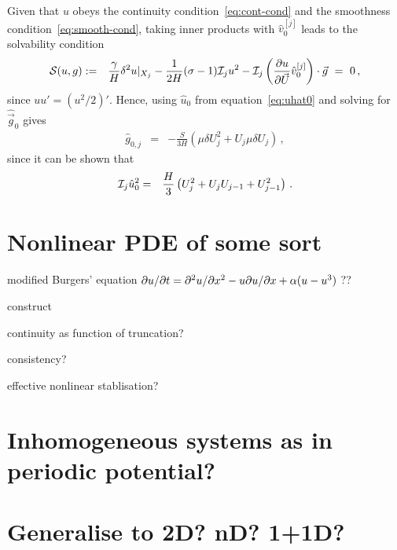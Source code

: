 \documentclass[12pt,a5paper]{article}
\begin{document}
Given that $u$ obeys the continuity condition~\eqref{eq:cont-cond} and the smoothness condition~\eqref{eq:smooth-cond}, taking inner products with $\hat{v}_0^{[j]}$ leads to the solvability condition
\begin{eqnarray}
       {\cal S}(u,g) & := & 
          \frac{\gamma}{H}\delta^2u|_{X_j} - \frac{1}{2H}(\sigma-1){\cal I}_j u^2
	-{\cal I}_j\left(\D {\vec U}u\hat{v}_0^{[j]}\right)\cdot\vec{g}~=~0 \,,
\label{eq:Sug}
\end{eqnarray}
since $uu'=(u^2/2)'$. %
Hence, using $\hat{u}_0$ from
equation~\eqref{eq:uhat0} and solving for $\hat{\vec{g}}_0$ gives
\begin{eqnarray}
	\hat{g}_{0,j} & = & 
- \frac{S}{3H}\left(\mu\delta U^2_j+U_j\mu\delta U_j\right)\,,
\end{eqnarray}
since it can be shown that
\begin{eqnarray}
{\cal I}_j\hat{u}_0^2 & = & \frac{H}{3}\left(U_j^2+U_jU_{j-1}+U_{j-1}^2\right)\,.
\end{eqnarray}

\section{Nonlinear PDE of some sort}

modified Burgers' equation \(\D tu=\DD xu-u\D xu+\alpha(u-u^3)\) ??

construct

continuity as function of truncation?

consistency?

effective nonlinear stablisation?


\section{Inhomogeneous systems as in periodic potential?}


\section{Generalise to 2D? nD? 1+1D?}


\clearpage
\appendix
\end{document}
